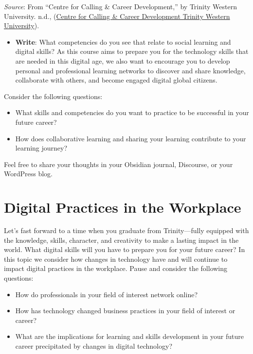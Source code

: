 \documentclass[
  letterpaper,
  DIV=11,
  numbers=noendperiod]{scrreprt}
\providecommand{\tightlist}{%
  \setlength{\itemsep}{0pt}\setlength{\parskip}{0pt}}\usepackage{longtable,booktabs,array}
\begin{document}
\begin{tcolorbox}
\begin{figure}[H]
\end{figure}%

\emph{Source}: From ``Centre for Calling \& Career Development,'' by
Trinity Western University. n.d.,
(\href{https://www.twu.ca/academics/academic-professional-support/centre-calling-career-development}{Centre
for Calling \& Career Development \textbar{} Trinity Western
University}).

\begin{itemize}
\tightlist
\item
  \textbf{Write}: What competencies do you see that relate to social
  learning and digital skills? As this course aims to prepare you for
  the technology skills that are needed in this digital age, we also
  want to encourage you to develop personal and professional learning
  networks to discover and share knowledge, collaborate with others, and
  become engaged digital global citizens.
\end{itemize}

Consider the following questions:

\begin{itemize}
\tightlist
\item
  What skills and competencies do you want to practice to be successful
  in your future career?
\item
  How does collaborative learning and sharing your learning contribute
  to your learning journey?
\end{itemize}

Feel free to share your thoughts in your Obsidian journal, Discourse, or
your WordPress blog.

\end{tcolorbox}

\section{Digital Practices in the
Workplace}\label{digital-practices-in-the-workplace}

Let's fast forward to a time when you graduate from Trinity---fully
equipped with the knowledge, skills, character, and creativity to make a
lasting impact in the world. What digital skills will you have to
prepare you for your future career? In this topic we consider how
changes in technology have and will continue to impact digital practices
in the workplace. Pause and consider the following questions:

\begin{itemize}
\tightlist
\item
  How do professionals in your field of interest network online?
\item
  How has technology changed business practices in your field of
  interest or career?
\item
  What are the implications for learning and skills development in your
  future career precipitated by changes in digital technology?
\end{itemize}
\end{document}
